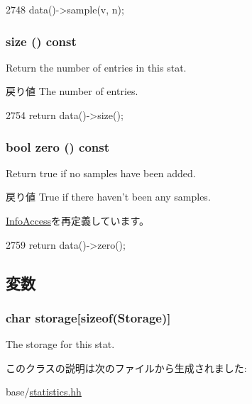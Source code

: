 \begin{DoxyCode}
2748 { data()->sample(v, n); }
\end{DoxyCode}
\hypertarget{classStats_1_1SparseHistBase_a503ab01f6c0142145d3434f6924714e7}{
\subsubsection[{size}]{ size () const}}
\label{classStats_1_1SparseHistBase_a503ab01f6c0142145d3434f6924714e7}
Return the number of entries in this stat. \begin{DoxyReturn}{戻り値}
The number of entries. 
\end{DoxyReturn}



\begin{DoxyCode}
2754 { return data()->size(); }
\end{DoxyCode}
\hypertarget{classStats_1_1SparseHistBase_a4e72b01b727d3165e75cba84eb507491}{
\subsubsection[{zero}]{\setlength{\rightskip}{0pt plus 5cm}bool zero () const}}
\label{classStats_1_1SparseHistBase_a4e72b01b727d3165e75cba84eb507491}
Return true if no samples have been added. \begin{DoxyReturn}{戻り値}
True if there haven't been any samples. 
\end{DoxyReturn}


\hyperlink{classStats_1_1InfoAccess_a4e72b01b727d3165e75cba84eb507491}{InfoAccess}を再定義しています。


\begin{DoxyCode}
2759 { return data()->zero(); }
\end{DoxyCode}


\subsection{変数}
\hypertarget{classStats_1_1SparseHistBase_ac200e6848cd31cfaedd12f91a90b7ac2}{
\subsubsection[{storage}]{\setlength{\rightskip}{0pt plus 5cm}char {\bf storage}\mbox{[}sizeof({\bf Storage})\mbox{]}}}
\label{classStats_1_1SparseHistBase_ac200e6848cd31cfaedd12f91a90b7ac2}
The storage for this stat. 

このクラスの説明は次のファイルから生成されました:\begin{DoxyCompactItemize}
\item 
base/\hyperlink{statistics_8hh}{statistics.hh}\end{DoxyCompactItemize}
